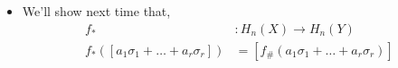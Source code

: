 \documentclass[../notes.tex]{subfiles}
\begin{document}
\begin{itemize}
    \item We'll show next time that,
        \begin{align*}
            f_*&:H_n(X)\rightarrow H_n(Y)\\
            f_*([a_1\sigma_1+\dots+a_r\sigma_r])&=[f_{\#}(a_1\sigma_1+\dots+a_r\sigma_r)]\\
        \end{align*}
\end{itemize}
\end{document}
